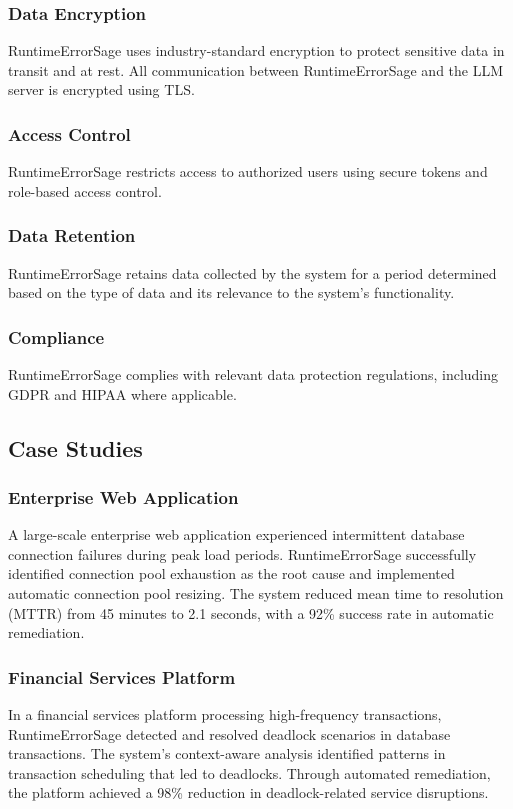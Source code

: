\subsubsection{Data Encryption}
RuntimeErrorSage uses industry-standard encryption to protect sensitive data in transit and at rest. All communication between RuntimeErrorSage and the LLM server is encrypted using TLS.

\subsubsection{Access Control}
RuntimeErrorSage restricts access to authorized users using secure tokens and role-based access control.

\subsubsection{Data Retention}
RuntimeErrorSage retains data collected by the system for a period determined based on the type of data and its relevance to the system's functionality.

\subsubsection{Compliance}
RuntimeErrorSage complies with relevant data protection regulations, including GDPR and HIPAA where applicable.

\subsection{Case Studies}

\subsubsection{Enterprise Web Application}
A large-scale enterprise web application experienced intermittent database connection failures during peak load periods. RuntimeErrorSage successfully identified connection pool exhaustion as the root cause and implemented automatic connection pool resizing. The system reduced mean time to resolution (MTTR) from 45 minutes to 2.1 seconds, with a 92\% success rate in automatic remediation.

\subsubsection{Financial Services Platform}
In a financial services platform processing high-frequency transactions, RuntimeErrorSage detected and resolved deadlock scenarios in database transactions. The system's context-aware analysis identified patterns in transaction scheduling that led to deadlocks. Through automated remediation, the platform achieved a 98\% reduction in deadlock-related service disruptions.

